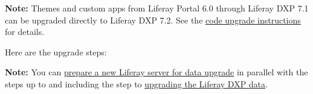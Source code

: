 \noindent\hrulefill

\noindent\hrulefill

\textbf{Note:} Themes and custom apps from Liferay Portal 6.0 through
Liferay DXP 7.1 can be upgraded directly to Liferay DXP 7.2. See the
\href{/docs/7-2/tutorials/-/knowledge_base/t/upgrading-code-to-product-ver}{code
upgrade instructions} for details.

\noindent\hrulefill

Here are the upgrade steps:

\noindent\hrulefill

\textbf{Note:} You can
\href{/docs/7-2/deploy/-/knowledge_base/d/preparing-to-upgrade-the-product-database}{prepare
a new Liferay server for data upgrade} in parallel with the steps up to
and including the step to
\href{/docs/7-2/deploy/-/knowledge_base/d/upgrading-the-product-data}{upgrading
the Liferay DXP data}.

\noindent\hrulefill

